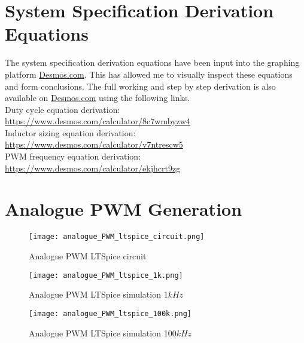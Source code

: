 


% 


\chapter{System Specification Derivation Equations} \label{A:specs}

The system specification derivation equations have been input into the graphing platform \url{Desmos.com}. This has allowed me to visually inspect these equations and form conclusions. The full working and step by step derivation is also available on \url{Desmos.com} using the following links.\\

Duty cycle equation derivation:\\
\url{https://www.desmos.com/calculator/8c7wmbyzw4}\\

Inductor sizing equation derivation:\\ 
\url{https://www.desmos.com/calculator/v7ntrescw5}\\

PWM frequency equation derivation:\\ 
\url{https://www.desmos.com/calculator/ekjhcrt9zg}\\

\chapter{Analogue PWM Generation} \label{A:analogue_PWM}


\begin{figure}[H]
    \texttt{[image: analogue\_PWM\_ltspice\_circuit.png]}
    \caption{Analogue PWM LTSpice circuit}
\end{figure}

\begin{figure}[H]
    \texttt{[image: analogue\_PWM\_ltspice\_1k.png]}
    \caption{Analogue PWM LTSpice simulation 1$kHz$}
\end{figure}

\begin{figure}[H]
    \texttt{[image: analogue\_PWM\_ltspice\_100k.png]}
    \caption{Analogue PWM LTSpice simulation 100$kHz$}
\end{figure}


